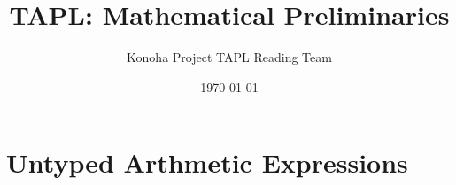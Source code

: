 \documentclass[12pt]{jsbook}
\title{TAPL: Mathematical Preliminaries}
\author{Konoha Project TAPL Reading Team}
\date{\today}
\begin{document}
\setcounter{chapter}{3}
\chapter{Untyped Arthmetic Expressions}









\end{document}
